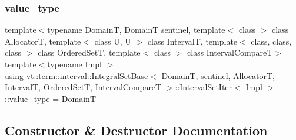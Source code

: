 \mbox{\label{structvt_1_1term_1_1interval_1_1_integral_set_base_1_1_interval_set_iter_abc7b9a7a287957cc11f7f8679084fad8}} 
\subsubsection{\texorpdfstring{value\+\_\+type}{value\_type}}
{\footnotesize\ttfamily template$<$typename DomainT, DomainT sentinel, template$<$ class $>$ class AllocatorT, template$<$ class U, U $>$ class IntervalT, template$<$ class, class, class $>$ class Ordered\+SetT, template$<$ class $>$ class Interval\+CompareT$>$ \\
template$<$typename Impl $>$ \\
using \hyperlink{structvt_1_1term_1_1interval_1_1_integral_set_base}{vt\+::term\+::interval\+::\+Integral\+Set\+Base}$<$ DomainT, sentinel, AllocatorT, IntervalT, Ordered\+SetT, Interval\+CompareT $>$\+::\hyperlink{structvt_1_1term_1_1interval_1_1_integral_set_base_1_1_interval_set_iter}{Interval\+Set\+Iter}$<$ Impl $>$\+::\hyperlink{structvt_1_1term_1_1interval_1_1_integral_set_base_1_1_interval_set_iter_abc7b9a7a287957cc11f7f8679084fad8}{value\+\_\+type} =  DomainT}



\subsection{Constructor \& Destructor Documentation}
\mbox{\label{structvt_1_1term_1_1interval_1_1_integral_set_base_1_1_interval_set_iter_ae998c7fc4e1db5a8d69ca061d70d5ceb}} 
